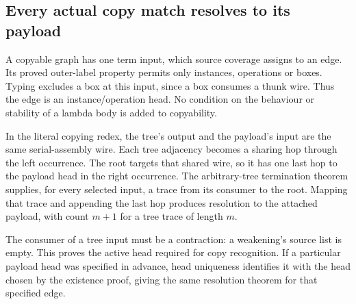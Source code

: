 



\subsection{Every actual copy match resolves to its payload}

A copyable graph has one term input, which source coverage assigns to an
edge. Its proved outer-label property permits only instances, operations or
boxes. Typing excludes a box at this input, since a box consumes a thunk wire.
Thus the edge is an instance/operation head. No condition on the behaviour or
stability of a lambda body is added to copyability.


In the literal copying redex, the tree's output and the payload's input are
the same serial-assembly wire. Each tree adjacency becomes a sharing hop
through the left occurrence. The root targets that shared wire, so it has one
last hop to the payload head in the right occurrence. The arbitrary-tree
termination theorem supplies, for every selected input, a trace from its
consumer to the root. Mapping that trace and appending the last hop produces
resolution to the attached payload, with count $m+1$ for a tree trace of
length $m$.





The consumer of a tree input must be a contraction: a weakening's source
list is empty. This proves the active head required for copy recognition.
If a particular payload head was specified in advance, head uniqueness
identifies it with the head chosen by the existence proof, giving the same
resolution theorem for that specified edge.


